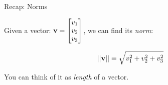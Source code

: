 \documentclass{beamer}
\begin{document}
\begin{frame}{Recap: Norms}
	\begin{flushleft}
		
		Given a vector: 
			$\mathbf{v} =
			\begin{bmatrix}
				v_{1}  \\
				v_{2}  \\
				v_{3}
			\end{bmatrix}$, we can find its \emph{norm}:
		
		\bigskip
		
		\begin{equation}
			||\mathbf{v}|| =
			\sqrt{v_{1}^2 + v_{2}^2+ v_{3}^2}
		\end{equation}
	
	\bigskip
	
	You can think of it as \emph{length} of a vector.
		
	\end{flushleft}
\end{frame}
\end{document}
